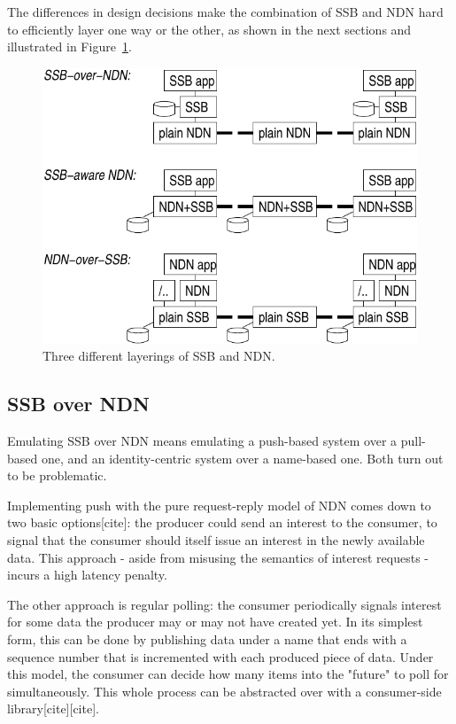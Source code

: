 \documentclass[9pt,sigconf]{acmart}
\begin{document}
The differences in design decisions make the combination of SSB and NDN hard to efficiently layer one way or the other, as shown in the next sections and illustrated in Figure~\ref{fig:ssb-and-ndn}.

\begin{figure}[htb]
  \raggedright
  \includegraphics[width=0.9\columnwidth]{figs/ssb-and-ndn.pdf}
  \caption{\label{fig:ssb-and-ndn}Three different layerings of SSB and NDN.}
\end{figure}

\subsection{SSB over NDN}
\label{ssect:ssb-over-ndn}

Emulating SSB over NDN means emulating a push-based system over a pull-based one, and an identity-centric system over a name-based one. Both turn out to be problematic.

Implementing push with the pure request-reply model of NDN comes down to two basic options[cite]: the producer could send an interest to the consumer, to signal that the consumer should itself issue an interest in the newly available data. This approach - aside from misusing the semantics of interest requests - incurs a high latency penalty.

The other approach is regular polling: the consumer periodically signals interest for some data the producer may or may not have created yet. In its simplest form, this can be done by publishing data under a name that ends with a sequence number that is incremented with each produced piece of data. Under this model, the consumer can decide how many items into the "future" to poll for simultaneously. This whole process can be abstracted over with a consumer-side library[cite][cite].
\end{document}

